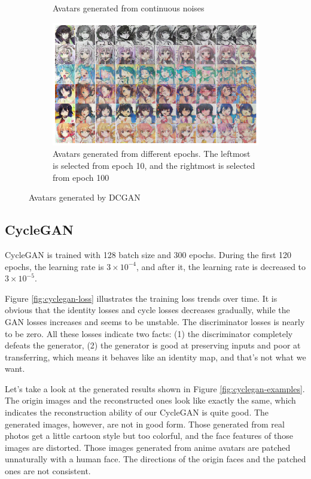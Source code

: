 \documentclass[10pt,twocolumn,letterpaper]{article}
\begin{document}
\begin{figure}[htb]
\begin{subfigure}{.48\linewidth}
      \caption{Avatars generated from continuous noises}
   \end{subfigure}
   \begin{subfigure}{.8\linewidth}
      \centering
      \includegraphics[width=\linewidth]{dcgan-result-training.png}
      \caption{Avatars generated from different epochs. The leftmost is
      selected from epoch 10, and the rightmost is selected from epoch 100}
   \end{subfigure}
   \caption{Avatars generated by DCGAN}
   \label{fig:dcgan-examples}
\end{figure}

\subsection{CycleGAN}

CycleGAN is trained with 128 batch size and 300 epochs. During the first 120
epochs, the learning rate is $3\times 10^{-4}$, and after it, the learning rate
is decreased to $3\times 10^{-5}$.

Figure \ref{fig:cyclegan-loss} illustrates the training loss trends over time.
It is obvious that the identity losses and cycle losses decreases gradually,
while the GAN losses increases and seems to be unstable. The discriminator
losses is nearly to be zero. All these losses indicate two facts: (1)
the discriminator completely defeats the generator, (2) the generator is good at
preserving inputs and poor at transferring, which means it behaves like an
identity map, and that's not what we want.

Let's take a look at the generated results shown in Figure
\ref{fig:cyclegan-examples}. The origin images and the reconstructed ones look
like exactly the same, which indicates the reconstruction ability of our
CycleGAN is quite good. The generated images, however, are not in good form.
Those generated from real photos get a little cartoon style but too colorful,
and the face features of those images are distorted. Those images generated from
anime avatars are patched unnaturally with a human face. The directions of the
origin faces and the patched ones are not consistent.
\end{document}
